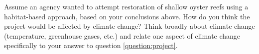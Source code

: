 \documentclass[12pt, addpoints, hidelinks]{exam}
\begin{document}
\begin{questions}

%
%
%
%

\question[5]
Assume an agency wanted to attempt restoration of shallow oyster reefs using a habitat-based approach, based on your conclusions above. How do you think the project would be affected by climate change? Think broadly about climate change (temperature, greenhouse gases, etc.) and relate one aspect of climate change specifically to your answer to question \ref{question:project}.


\end{questions}
\end{document}
